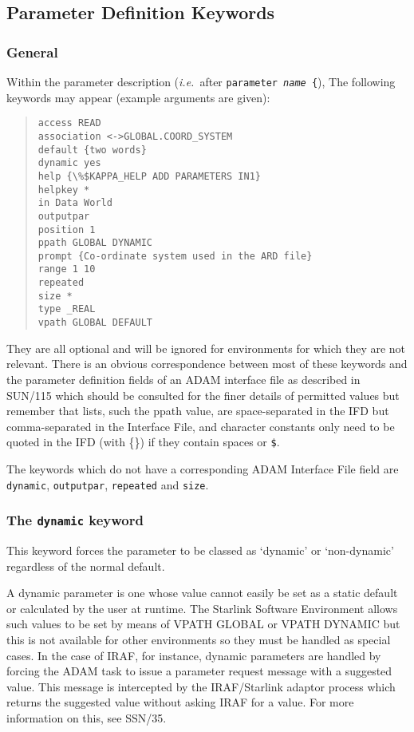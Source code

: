 \documentclass[twoside,11pt]{article}
\newcommand{\htmlref}[2]{#1}
\newcommand{\xref}[3]{#1}
\newcommand{\xlabel}[1]{}
\begin{document}
\subsection{\xlabel{parameter_definition_keywords}Parameter Definition Keywords}
\subsubsection{\xlabel{general}General}
Within the parameter description 
(\textit{i.e.}\ after \texttt{parameter \textit{name} \{}), The following
keywords may appear (example arguments are given):
\begin{quote} \begin{verbatim}
access READ
association <->GLOBAL.COORD_SYSTEM
default {two words}
dynamic yes
help {\%$KAPPA_HELP ADD PARAMETERS IN1}
helpkey *
in Data World
outputpar
position 1
ppath GLOBAL DYNAMIC
prompt {Co-ordinate system used in the ARD file}
range 1 10
repeated
size *
type _REAL
vpath GLOBAL DEFAULT
\end{verbatim} \end{quote}
They are all optional and will be ignored for environments for which they are 
not relevant. There is an obvious correspondence between most of these 
keywords and the parameter definition fields of an ADAM interface file as
described in 
\xref{SUN/115}{sun115}{}
which should be consulted for the finer details of permitted values but
remember that lists, such the ppath value, are space-separated in the IFD but 
comma-separated in the Interface File, and character constants only need to be
quoted in the IFD (with \{\}) if they contain spaces or \texttt{\$}.

The keywords which do not have a corresponding ADAM Interface File field
are
\htmlref{\texttt{dynamic}}{dynamic_key},
\htmlref{\texttt{outputpar}}{outputpar_key},
\htmlref{\texttt{repeated}}{repeated_key}
and
\htmlref{\texttt{size}}{size_key}.

\subsubsection{\xlabel{the_dynamic_keyword}\label{dynamic_key}The 
\texttt{dynamic} keyword}
This keyword forces the parameter to be classed as `dynamic' or `non-dynamic'
regardless of the normal default. 

A dynamic parameter is one whose value cannot
easily be set as a static default or calculated by the user at runtime. 
The Starlink Software Environment allows such values to be set by means of 
VPATH GLOBAL or VPATH DYNAMIC but this is not available for other environments
so they must be handled as special cases. In the case of IRAF, for instance,
dynamic parameters are handled by forcing the ADAM task to issue a parameter
request message with a suggested value. This message is intercepted by the
\xref{IRAF/Starlink adaptor process}{ssn35}{the_adaptor_process}
which returns the suggested value without asking IRAF for a value.
For more information on this, see
\xref{SSN/35}{ssn35}{dynamic_parameters}.
\end{document}

